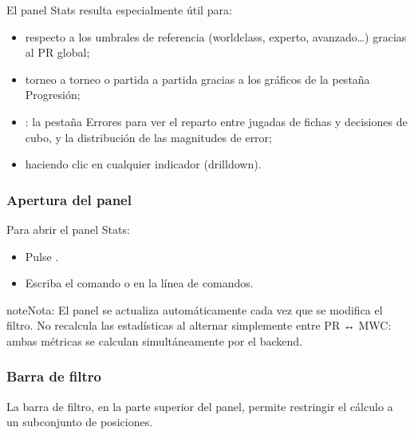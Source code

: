 \documentclass[letterpaper,10pt,spanish]{sphinxmanual}
\begin{document}
\sphinxAtStartPar
El panel Stats resulta especialmente útil para:
\begin{itemize}
\item {} 
\sphinxAtStartPar
{} respecto a los umbrales de referencia (world\sphinxhyphen{}class, experto, avanzado…) gracias al PR global;

\item {} 
\sphinxAtStartPar
{} torneo a torneo o partida a partida gracias a los gráficos de la pestaña Progresión;

\item {} 
\sphinxAtStartPar
{}: la pestaña Errores para ver el reparto entre jugadas de fichas y decisiones de cubo, y la distribución de las magnitudes de error;

\item {} 
\sphinxAtStartPar
{} haciendo clic en cualquier indicador (drill\sphinxhyphen{}down).

\end{itemize}


\subsubsection{Apertura del panel}
\label{\detokenize{manuel:ouverture-du-panneau}}
\sphinxAtStartPar
Para abrir el panel Stats:
\begin{itemize}
\item {} 
\sphinxAtStartPar
Pulse .

\item {} 
\sphinxAtStartPar
Escriba el comando  o  en la línea de comandos.

\end{itemize}

\begin{sphinxadmonition}{note}{Nota:}
\sphinxAtStartPar
El panel se actualiza automáticamente cada vez que se modifica el filtro. No recalcula las estadísticas al alternar simplemente entre PR ↔ MWC: ambas métricas se calculan simultáneamente por el backend.
\end{sphinxadmonition}


\subsubsection{Barra de filtro}
\label{\detokenize{manuel:barre-de-filtre}}
\sphinxAtStartPar
La barra de filtro, en la parte superior del panel, permite restringir el cálculo a un subconjunto de posiciones.
\end{document}
